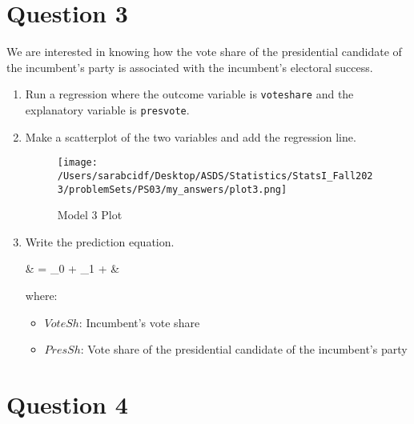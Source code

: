 \documentclass[12pt,letterpaper]{article}
\begin{document}
	\newpage	
\section*{Question 3}

\noindent We are interested in knowing how the vote share of the presidential candidate of the incumbent's party is associated with the incumbent's electoral success.
	\vspace{.25cm}
	\begin{enumerate}
		\item Run a regression where the outcome variable is \texttt{voteshare} and the explanatory variable is \texttt{presvote}. \vspace{0.5cm}
			
		
			
		\item Make a scatterplot of the two variables and add the regression line. \vspace{0.5cm}
		
		
		
		\begin{figure}[H]
			\centering
			\texttt{[image: /Users/sarabcidf/Desktop/ASDS/Statistics/StatsI\_Fall2023/problemSets/PS03/my\_answers/plot3.png]}
			\caption{Model 3 Plot}
		\end{figure}
			
		\item Write the prediction equation.
		
		{\setlength{\abovedisplayskip}{2pt} 
			\setlength{\belowdisplayskip}{6pt} 
			
			\begin{flalign*}
				& = \beta_0 + \beta_1 \cdot {} + \varepsilon &
			\end{flalign*}
			
			where: 
			
			\begin{itemize}
				\item $VoteSh$: Incumbent's vote share
				\item $PresSh$: Vote share of the presidential candidate of the incumbent's party
			\end{itemize}
		}
		
	\end{enumerate}
	

\newpage	
\section*{Question 4}
\end{document}
